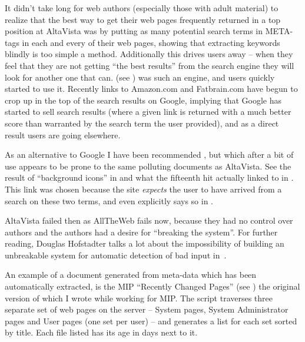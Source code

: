 It didn't take long for web authors (especially those with adult
material) to realize that the best way to get their web pages
frequently returned in a top position at AltaVista was by putting as
many potential search terms in META-tags in each and every of their
web pages, showing that extracting keywords blindly 
is too simple a method.  Additionally this
drives users away -- when they feel that they are not getting ``the
best results'' from the search engine they will look for another one
that can.  (see
) was such an engine, and users quickly
started to use it. Recently links to Amazon.com and Fatbrain.com have
begun to crop up in the top of the search results on Google, implying
that Google has started to sell search results (where a given link is
returned with a much better score than warranted by the search term
the user provided), and as a direct result users are going elsewhere.

As an alternative to Google I have been recommended
, but which after a bit of
use appears to be prone to the same polluting documents as AltaVista.
See the result of ``background icons'' in
 and what the fifteenth hit actually
linked to in . This link was
chosen because the site \textit{expects} the user to have
arrived from a search on these two terms, and even explicitly 
says so in .




AltaVista failed then as AllTheWeb fails now, because they had no
control over authors and the authors had a desire for ``breaking the
system''.  For further reading, Douglas Hofstadter talks a lot about
the impossibility of building an unbreakable system for automatic
detection of bad input in~\cite{goedelescherbach}.



 An example of a document generated from
meta-data which has been automatically extracted, is the MIP
``Recently Changed Pages'' (see ) the
original version of which I wrote while working for MIP.
The script traverses three separate set of web pages on the
server -- System pages, System Administrator pages and User
pages (one set per user) -- and generates a list for each set
sorted by title.  Each file listed has its age in days next
to it.

